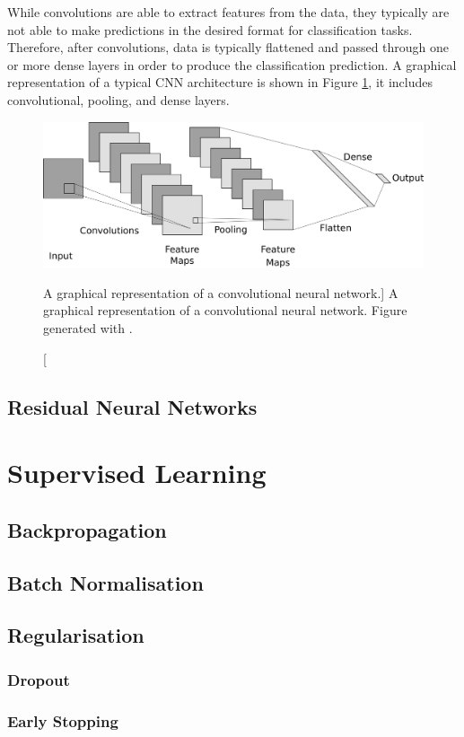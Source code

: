 While convolutions are able to extract features from the data, they typically
are not able to make predictions in the desired format for classification tasks.
Therefore, after convolutions, data is typically flattened and passed through
one or more dense layers in order to produce the classification prediction. A
graphical representation of a typical CNN architecture is shown in Figure
\ref{fig:cnn_layer}, it includes convolutional, pooling, and dense layers.
\begin{figure}

	\centering

	\includegraphics[width = \textwidth]{figures/cnn_layer.png}

	\caption
	[A graphical representation of a convolutional neural network.]
	{ A graphical representation of a convolutional neural network. Figure
	generated with \cite{cnn_diagrams}.}

	\label{fig:cnn_layer}

\end{figure}

\subsection{Residual Neural Networks}
\cite{He_2016_CVPR}

\section{Supervised Learning}
\subsection{Backpropagation}
\subsection{Batch Normalisation}
\subsection{Regularisation}
\subsubsection*{Dropout}
\subsubsection*{Early Stopping}
